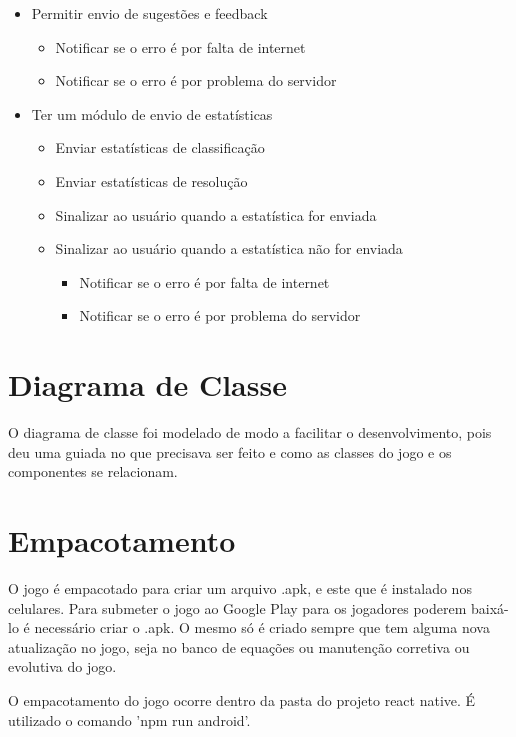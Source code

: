\begin{itemize}
	\item Permitir envio de sugestões e feedback
		\begin{itemize}
			\item Notificar se o erro é por falta de internet
			\item Notificar se o erro é por problema do servidor			
		\end{itemize}

	\item Ter um módulo de envio de estatísticas
		\begin{itemize}
			\item Enviar estatísticas de classificação
			\item Enviar estatísticas de resolução
			\item Sinalizar ao usuário quando a estatística for enviada
			\item Sinalizar ao usuário quando a estatística não for enviada
				\begin{itemize}
					\item Notificar se o erro é por falta de internet
					\item Notificar se o erro é por problema do servidor
				\end{itemize}
		\end{itemize}
\end{itemize}

\section[Diagrama de Classe]{Diagrama de Classe}
O diagrama de classe foi modelado de modo a facilitar o desenvolvimento, pois deu uma guiada no que precisava ser feito e como as classes do jogo e os componentes se relacionam. 

\section[Empacotamento]{Empacotamento}
O jogo é empacotado para criar um arquivo .apk, e este que é instalado nos celulares. Para submeter o jogo ao Google Play para os jogadores poderem baixá-lo é necessário criar o .apk. O mesmo só é criado sempre que tem alguma nova atualização no jogo, seja no banco de equações ou manutenção corretiva ou evolutiva do jogo.

O empacotamento do jogo ocorre dentro da pasta do projeto react native. É utilizado o comando 'npm run android'.

